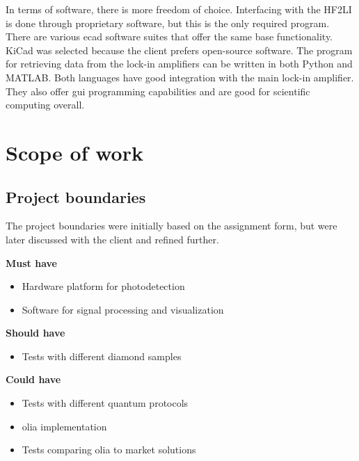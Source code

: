 In terms of software, there is more freedom of choice. Interfacing with the HF2LI is done through proprietary software, but this is the only required program. There are various \gls{ecad} software suites that offer the same base functionality. KiCad was selected because the client prefers open-source software. The program for retrieving data from the lock-in amplifiers can be written in both Python and MATLAB. Both languages have good integration with the main lock-in amplifier. They also offer \gls{gui} programming capabilities and are good for scientific computing overall.



\section{Scope of work}

\subsection{Project boundaries}\label{project_boundaries}
The project boundaries were initially based on the assignment form, but were later discussed with the client and refined further. 

\textbf{Must have}
\begin{itemize}
	\item Hardware platform for photodetection
	\item Software for signal processing and visualization
\end{itemize}

\textbf{Should have}
\begin{itemize}
	\item Tests with different diamond samples
\end{itemize}

\textbf{Could have}
\begin{itemize}
	\item Tests with different quantum protocols
	\item \gls{olia} implementation
	\item Tests comparing \gls{olia} to market solutions
\end{itemize}

